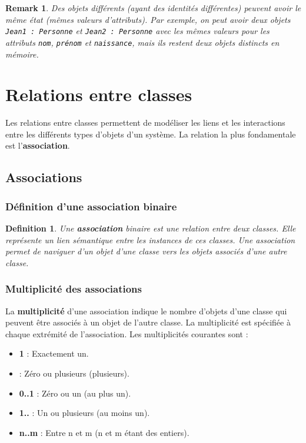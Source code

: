 \documentclass{article}
\newtheorem{definition}{Definition}
\newtheorem{remark}{Remark}
\begin{document}
\begin{remark}
Des objets différents (ayant des identités différentes) peuvent avoir le même état (mêmes valeurs d'attributs). Par exemple, on peut avoir deux objets \texttt{Jean1 : Personne} et \texttt{Jean2 : Personne} avec les mêmes valeurs pour les attributs \texttt{nom}, \texttt{prénom} et \texttt{naissance}, mais ils restent deux objets distincts en mémoire.
\end{remark}


\section{Relations entre classes}

Les relations entre classes permettent de modéliser les liens et les interactions entre les différents types d'objets d'un système. La relation la plus fondamentale est l'\textbf{association}.

\subsection{Associations}

\subsubsection{Définition d'une association binaire}
\begin{definition}
Une \textbf{association} binaire est une relation entre deux classes. Elle représente un lien sémantique entre les instances de ces classes.  Une association permet de naviguer d'un objet d'une classe vers les objets associés d'une autre classe.
\end{definition}

\subsubsection{Multiplicité des associations}
La \textbf{multiplicité} d'une association indique le nombre d'objets d'une classe qui peuvent être associés à un objet de l'autre classe. La multiplicité est spécifiée à chaque extrémité de l'association. Les multiplicités courantes sont :

\begin{itemize}
    \item \textbf{1} : Exactement un.
    \item \textbf{\*} : Zéro ou plusieurs (plusieurs).
    \item \textbf{0..1} : Zéro ou un (au plus un).
    \item \textbf{1..\*} : Un ou plusieurs (au moins un).
    \item \textbf{n..m} : Entre n et m (n et m étant des entiers).
\end{itemize}
\end{document}
